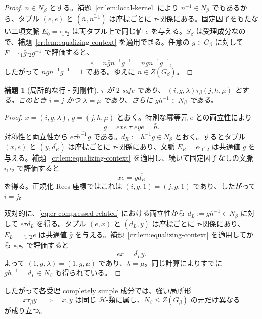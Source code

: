 \documentclass[10pt,a4paper]{ltjsarticle}
\newtheorem{lemma}[theorem]{補題}
\theoremstyle{definition}
\theoremstyle{remark}
\newcommand{\blank}{\square}
\begin{document}
\begin{proof}
$n\in N_\beta$ とする。補題~\ref{cr:lem:local-kernel} により $n^{-1}\in N_\beta$ でもあるから、タプル
\((e,e)\) と \((\bar n,\overline{n^{-1}})\)
は座標ごとに $\tau$-関係にある。固定因子をもたない二項文脈
$E_0=\blank_1\blank_2$
は両タプル上で同じ値 $e$ を与える。$S_\beta$ は受理成分なので、補題~\ref{cr:lem:equalizing-context} を適用できる。任意の $g\in G_\beta$ に対して
\(F=\blank_1\bar g\blank_2\overline{g^{-1}}\)
で評価すると、
\[
e
=
\bar n\bar g\overline{n^{-1}}\overline{g^{-1}}
=
\overline{ngn^{-1}g^{-1}},
\]
したがって $ngn^{-1}g^{-1}=1$ である。ゆえに $n\in Z(G_\beta)$。
\end{proof}

\begin{lemma}[局所的な行・列剛性]
\label{cr:lem:index-rigidity}
$\tau$ が $2$-safe であり、
\((i,g,\lambda)\tau_\beta(j,h,\mu)\)
とする。このとき $i=j$ かつ $\lambda=\mu$ であり、さらに
\(gh^{-1}\in N_\beta\)
である。
\end{lemma}

\begin{proof}
$x=(i,g,\lambda)$, $y=(j,h,\mu)$ とおく。特別な冪等元 $e$ との両立性により
\begin{equation}
\bar g=exe\;\tau\;eye=\bar h.
\label{eq:cr-compressed-related}
\end{equation}
対称性と両立性から
\(e\tau\overline{h^{-1}g}\)
である。$d_R:=h^{-1}g\in N_\beta$ とおく。するとタプル $(x,e)$ と $(y,\overline{d_R})$ は座標ごとに $\tau$-関係にあり、文脈
\(E_R=e\blank_1\blank_2\)
は共通値 $\bar g$ を与える。補題~\ref{cr:lem:equalizing-context} を適用し、続いて固定因子なしの文脈 $\blank_1\blank_2$ で評価すると
\[
xe=y\overline{d_R}
\]
を得る。正規化 Rees 座標ではこれは
$(i,g,1)=(j,g,1)$
であり、したがって $i=j$。

双対的に、\eqref{eq:cr-compressed-related} における両立性から
$d_L:=gh^{-1}\in N_\beta$ に対して $e\tau\overline{d_L}$ を得る。タプル $(e,x)$ と $(\overline{d_L},y)$ は座標ごとに $\tau$-関係にあり、
\(E_L=\blank_1\blank_2e\)
は共通値 $\bar g$ を与える。補題~\ref{cr:lem:equalizing-context} を適用してから $\blank_1\blank_2$ で評価すると
\[
ex=\overline{d_L}y.
\]
よって $(1,g,\lambda)=(1,g,\mu)$ であり、$\lambda=\mu$。同じ計算によりすでに $gh^{-1}=d_L\in N_\beta$ も得られている。
\end{proof}

したがって各受理 completely simple 成分では、強い局所形
\[
x\tau_\beta y
\quad\Longrightarrow\quad
x,y\text{ は同じ }\mathcal H\text{-類に属し、}
N_\beta\le Z(G_\beta)\text{ の元だけ異なる}
\tag{LR}
\]
が成り立つ。
\end{document}

